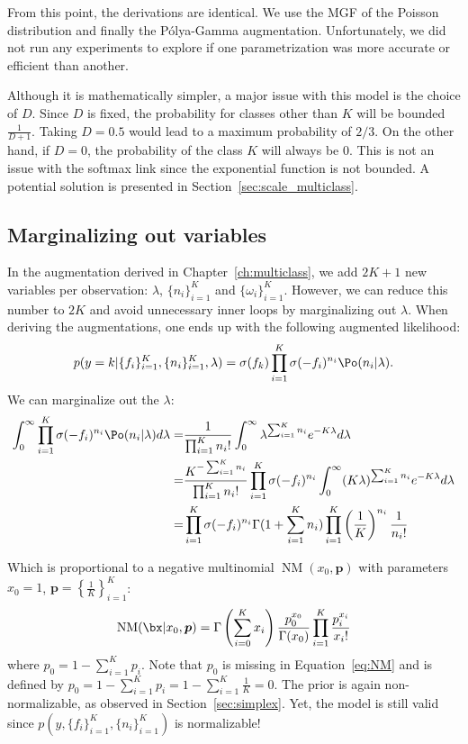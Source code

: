 From this point, the derivations are identical.
We use the \ac{MGF} of the Poisson distribution and finally the P\'olya-Gamma augmentation.
Unfortunately, we did not run any experiments to explore if one parametrization was more accurate or efficient than another.

Although it is mathematically simpler, a major issue with this model is the choice of $D$.
Since $D$ is fixed, the probability for classes other than $K$ will be bounded $\frac{1}{D + 1}$.
Taking $D=0.5$ would lead to a maximum probability of $2/3$.
On the other hand, if $D=0$, the probability of the class $K$ will always be $0$.
This is not an issue with the softmax link since the exponential function is not bounded.
A potential solution is presented in Section~\ref{sec:scale_multiclass}.

\subsection{Marginalizing out variables}

In the augmentation derived in Chapter~\ref{ch:multiclass}, we add $2K + 1$ new variables per observation: $\lambda$, $\{n_i\}_{i=1}^K$ and $\{\omega_i\}_{i=1}^K$.
However, we can reduce this number to $2K$ and avoid unnecessary inner loops by marginalizing out $\lambda$.
When deriving the augmentations, one ends up with the following augmented likelihood:
\begin{align}
    p(y=k|\{f_i\}_{i=1}^K,\{n_i\}_{i=1}^K,\lambda) = \sigma(f_k) \prod_{i=1}^K \sigma(-f_i)^{n_i} \Po (n_i|\lambda).
\end{align}
We can marginalize out the $\lambda$:
\begin{align}
    \int_{0}^\infty \prod_{i=1}^K \sigma(-f_i)^{n_i} \Po (n_i|\lambda)d\lambda =& \frac{1}{\prod_{i=1}^K n_i!}\int_{0}^\infty \lambda^{\sum_{i=1}^K n_i}e^{-K\lambda}d\lambda \nonumber\\
    =& \frac{K^{-\sum_{i=1}^K n_i}}{\prod_{i=1}^K n_i!}\prod_{i=1}^K \sigma(-f_i)^{n_i} \int_{0}^\infty (K\lambda)^{\sum_{i=1}^K n_i}e^{-K\lambda}d\lambda \nonumber\\
    =& \prod_{i=1}^K\sigma(-f_i)^{n_i}\Gamma(1 + \sum_{i=1}^K n_i) \prod_{i=1}^K \left(\frac{1}{K}\right)^{n_i}\frac{1}{n_i!} \label{eq:NM}
\end{align}

Which is proportional to a negative multinomial $\operatorname{NM}(x_0, \boldsymbol{p})$ with parameters $x_0=1$, $\boldsymbol{p}=\left\{\frac{1}{K}\right\}_{i=1}^K$:
\begin{align*}
    \operatorname{NM}(\bx|x_0,\boldsymbol{p}) = \Gamma\left(\sum_{i=0}^K x_i\right) \frac{p_0^{x_0}}{\Gamma(x_0)}\prod_{i=1}^K \frac{p_i^{x_i}}{x_i!}   
\end{align*}
where $p_0 = 1 - \sum_{i=1}^K p_i$.
Note that $p_0$ is missing in Equation~\ref{eq:NM} and is defined by $p_0= 1 - \sum_{i=1}^K p_i = 1 - \sum_{i=1}^{K}\frac{1}{K} = 0$.
The prior is again non-normalizable, as observed in Section~\ref{sec:simplex}.
Yet, the model is still valid since $p(y,\{f_i\}_{i=1}^K,\{n_i\}_{i=1}^K)$ is normalizable!

